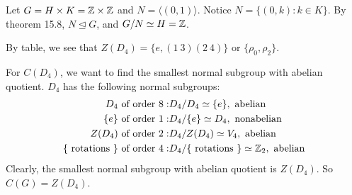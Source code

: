\documentclass[12pt]{article}
\begin{document}
\begin{problem}[15.6]
	Let $ G=H \times K= \mathbb{Z} \times \mathbb{Z}$ and $ N=\langle (0,1) \rangle$. Notice $ N=\{(0,k):k \in K\} $. By theorem 15.8, $ N \trianglelefteq G$, and $ G / N \simeq H= \mathbb{Z}$.
\end{problem}
\begin{problem}[15.13]
	By table, we see that $ Z(D_4) = \{e, (1\ 3)(2\ 4) \} $ or $ \{\rho_0, \rho_2\} $.

	For $ C(D_4)$, we want to find the smallest normal subgroup with abelian quotient. $ D_4$ has the following normal subgroups:
	\begin{align*}
		D_4 \text{ of order }8: &D_4 /D_4 \simeq \{e\}, \text{ abelian}\\
		\{e\} \text{ of order 1}: & D_4 /\{e\} \simeq D_4 , \text{ nonabelian}\\
		Z(D_4) \text{ of order 2}: & D_4 /Z(D_4) \simeq V_4, \text{ abelian}\\
		\{ \text{ rotations } \} \text{ of order 4}: & D_4 / \{ \text{ rotations } \} \simeq\mathbb{Z}_2, \text{ abelian}    
	\end{align*}
	Clearly, the smallest normal subgroup with abelian quotient is $ Z(D_4)$. So $ C(G) = Z(D_4)$.
\end{problem}
\end{document}
